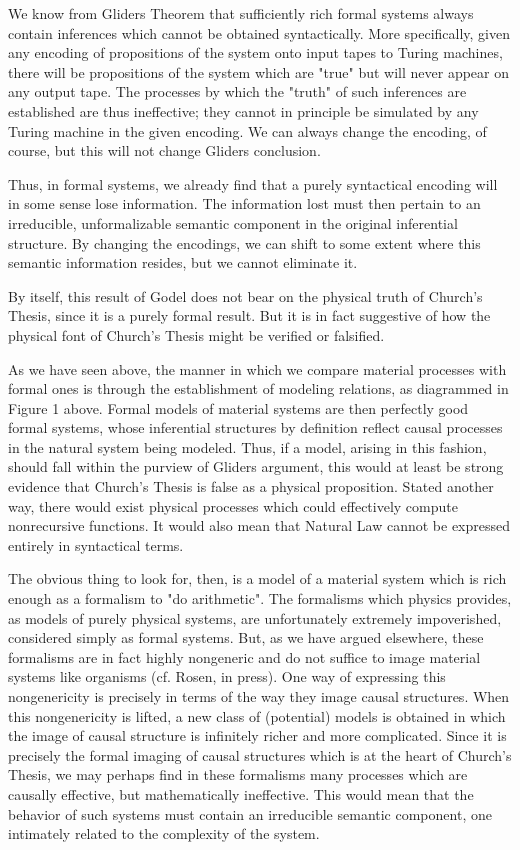 \documentclass[a4paper,12pt]{article}
\begin{document}
We know from Gliders Theorem that sufficiently rich formal systems
always contain inferences which cannot be obtained syntactically.  More
specifically, given any encoding of propositions of the system onto input
tapes to Turing machines, there will be propositions of the system which are
"true" but will never appear on any output tape. The processes by which the
"truth" of such inferences are established are thus ineffective; they cannot
in principle be simulated by any Turing machine in the given encoding. We
can always change the encoding, of course, but this will not change Gliders
conclusion.

Thus, in formal systems, we already find that a purely syntactical encoding
will in some sense lose information. The information lost must then
pertain to an irreducible, unformalizable semantic component in the original
inferential structure. By changing the encodings, we can shift to some
extent where this semantic information resides, but we cannot eliminate it.

By itself, this result of Godel does not bear on the physical truth of
Church's Thesis, since it is a purely formal result. But it is in fact suggestive
of how the physical font of Church's Thesis might be verified or falsified.

As we have seen above, the manner in which we compare material processes with formal ones is through the establishment of
modeling relations, as diagrammed in Figure 1 above. Formal models of material systems are
then perfectly good formal systems, whose inferential structures by definition reflect causal processes in the natural system being modeled.
Thus, if a model, arising in this fashion, should fall within the purview of Gliders
argument, this would at least be strong evidence that Church's Thesis is
false as a physical proposition. Stated another way, there would exist physical processes which could effectively compute
nonrecursive functions. It would also mean that Natural Law cannot be expressed entirely in syntactical terms.

The obvious thing to look for, then, is a model of a material system
which is rich enough as a formalism to "do arithmetic". The formalisms
which physics provides, as models of purely physical systems, are unfortunately
extremely impoverished, considered simply as formal systems. But,
as we have argued elsewhere, these formalisms are in fact highly nongeneric
and do not suffice to image material systems like organisms (cf. Rosen, in
press). One way of expressing this nongenericity is precisely in terms of the
way they image causal structures. When this nongenericity is lifted, a new
class of (potential) models is obtained in which the image of causal structure
is infinitely richer and more complicated. Since it is precisely the formal
imaging of causal structures which is at the heart of Church's Thesis, we may perhaps find in these formalisms many processes
which are causally effective, but mathematically ineffective. This would mean that the behavior of such systems must contain
an irreducible semantic component, one intimately related to the complexity of the system.
\end{document}
